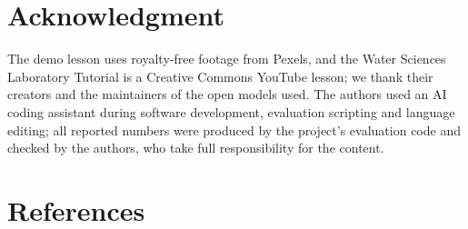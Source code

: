 \documentclass[9pt,a4paper]{extarticle}
\begin{document}
\section*{Acknowledgment}
The demo lesson uses royalty-free footage from Pexels, and the Water Sciences Laboratory Tutorial is a Creative Commons
YouTube lesson; we thank their creators and the maintainers of the open models used. The authors used an AI coding
assistant during software development, evaluation scripting and language editing; all reported numbers were produced
by the project's evaluation code and checked by the authors, who take full responsibility for the content.

\section*{References}
\end{document}
